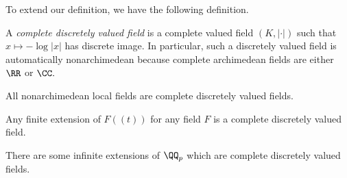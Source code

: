 To extend our definition, we have the following definition.
\begin{definition}
	A \textit{complete discretely valued field} is a complete valued field $(K,|\cdot|)$ such that $x\mapsto-\log|x|$ has discrete image. In particular, such a discretely valued field is automatically nonarchimedean because complete archimedean fields are either $\RR$ or $\CC.$
\end{definition}
\begin{example}
	All nonarchimedean local fields are complete discretely valued fields.
\end{example}
\begin{example}
	Any finite extension of $F((t))$ for any field $F$ is a complete discretely valued field.
\end{example}
\begin{example}
	There are some infinite extensions of $\QQ_p$ which are complete discretely valued fields.
\end{example}


